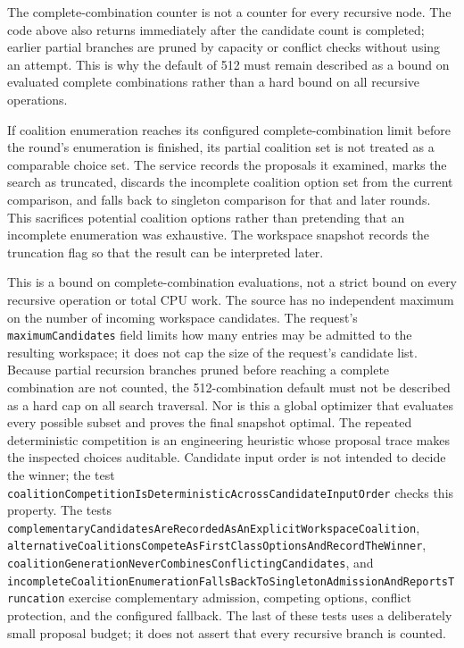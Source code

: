 The complete-combination counter is not a counter for every recursive node. The code above also returns immediately after the candidate count is completed; earlier partial branches are pruned by capacity or conflict checks without using an attempt. This is why the default of 512 must remain described as a bound on evaluated complete combinations rather than a hard bound on all recursive operations.

If coalition enumeration reaches its configured complete-combination limit before the round's enumeration is finished, its partial coalition set is not treated as a comparable choice set. The service records the proposals it examined, marks the search as truncated, discards the incomplete coalition option set from the current comparison, and falls back to singleton comparison for that and later rounds. This sacrifices potential coalition options rather than pretending that an incomplete enumeration was exhaustive. The workspace snapshot records the truncation flag so that the result can be interpreted later.

This is a bound on complete-combination evaluations, not a strict bound on every recursive operation or total CPU work. The source has no independent maximum on the number of incoming workspace candidates. The request's \texttt{maximumCandidates} field limits how many entries may be admitted to the resulting workspace; it does not cap the size of the request's candidate list. Because partial recursion branches pruned before reaching a complete combination are not counted, the 512-combination default must not be described as a hard cap on all search traversal. Nor is this a global optimizer that evaluates every possible subset and proves the final snapshot optimal. The repeated deterministic competition is an engineering heuristic whose proposal trace makes the inspected choices auditable. Candidate input order is not intended to decide the winner; the test \texttt{coalition\allowbreak{}Competition\allowbreak{}Is\allowbreak{}Deterministic\allowbreak{}Across\allowbreak{}Candidate\allowbreak{}Input\allowbreak{}Order} checks this property. The tests \texttt{complementary\allowbreak{}Candidates\allowbreak{}Are\allowbreak{}Recorded\allowbreak{}As\allowbreak{}An\allowbreak{}Explicit\allowbreak{}Workspace\allowbreak{}Coalition}, \texttt{alternative\allowbreak{}Coalitions\allowbreak{}Compete\allowbreak{}As\allowbreak{}First\allowbreak{}Class\allowbreak{}Options\allowbreak{}And\allowbreak{}Record\allowbreak{}The\allowbreak{}Winner}, \texttt{coalition\allowbreak{}Generation\allowbreak{}Never\allowbreak{}Combines\allowbreak{}Conflicting\allowbreak{}Candidates}, and \texttt{incomplete\allowbreak{}Coalition\allowbreak{}Enumeration\allowbreak{}Falls\allowbreak{}Back\allowbreak{}To\allowbreak{}Singleton\allowbreak{}Admission\allowbreak{}And\allowbreak{}Reports\allowbreak{}Truncation} exercise complementary admission, competing options, conflict protection, and the configured fallback. The last of these tests uses a deliberately small proposal budget; it does not assert that every recursive branch is counted.

